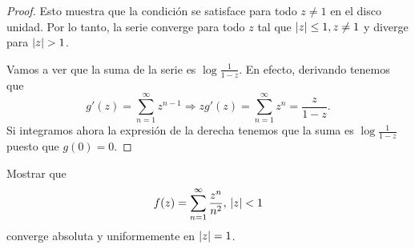 \begin{proof}
    Esto muestra que la condición se satisface para todo $z \not = 1$ en el disco unidad. Por lo tanto, la serie converge para todo $z$ tal que $\left\lvert z\right\rvert \leq 1, z \not = 1$ y diverge para $\left\lvert z\right\rvert > 1$. \\ \par

    Vamos a ver que la suma de la serie es $\log{\frac{1}{1 - z}}$. En efecto, derivando tenemos que
    \begin{equation*}
        g'(z) = \sum_{n=1}^{\infty} z^{n-1} \Rightarrow z g'(z) = \sum_{n=1}^{\infty} z^n = \frac{z}{1 - z}.
     \end{equation*}
     Si integramos ahora la expresión de la derecha tenemos que la suma es $\log{\frac{1}{1 - z}}$ puesto que $g(0) = 0$.

\end{proof}


\begin{example}
    Mostrar que
    \begin{equation*}
        f(z) = \sum_{n=1}^{\infty} \frac{z^n}{n^2}, \, \left\lvert z\right\rvert < 1
    \end{equation*}
    converge absoluta y uniformemente en $\left\lvert z\right\rvert = 1$.
\end{example}

